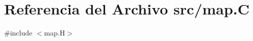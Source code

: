\hypertarget{map_8_c}{}\section{Referencia del Archivo src/map.C}
\label{map_8_c}
{\ttfamily \#include $<$map.\+H$>$}\newline
